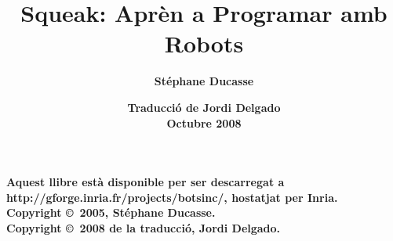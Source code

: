 \documentclass[a4paper,10pt,twoside]{book}
\begin{document}
 
\frontmatter 

\author{\Large{\bf Stéphane Ducasse}} 
\title{{\huge \bf Squeak: Aprèn a Programar amb Robots}} 
\date{{\vspace*{7cm} \bf Traducció de Jordi Delgado\\  Octubre 2008}} 
\maketitle

\vfill
\begin{footnotesize}
\setlength{\parindent}{0pt}

\textbf{\small Aquest llibre està disponible per ser descarregat a \textsf{http://gforge.inria.fr/projects/botsinc/}, hostatjat per Inria.}\\[0.5cm]

\textbf{\small Copyright \copyright~2005, St\'ephane Ducasse.}\\[0.5cm]
\textbf{\small Copyright \copyright~2008 de la traducció, Jordi Delgado.}\\[0.5cm]


\end{footnotesize}
\end{document}
